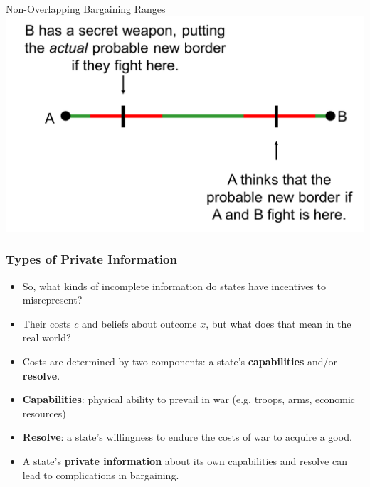 \documentclass{beamer}
\begin{document}
\begin{frame}{Non-Overlapping Bargaining Ranges}
	\centering
	\includegraphics[width=\textwidth,height=0.8\textheight,keepaspectratio]{Bluff3.png}
\end{frame}

\begin{frame} 
	\frametitle{\LARGE{Types of Private Information}}
	\begin{itemize}
		\item So, what kinds of incomplete information do states have incentives to misrepresent? \pause
		\item Their costs $c$ and beliefs about outcome $x$, but what does that mean in the real world? \pause
		\item Costs are determined by two components: a state's \textbf{capabilities} and/or \textbf{resolve}. \pause
		\item \textbf{Capabilities}: physical ability to prevail in war (e.g. troops, arms, economic resources) \pause
		\item \textbf{Resolve}: a state's willingness to endure the costs of war to acquire a good. \pause 
		\item A state's \textbf{private information} about its own capabilities and resolve can lead to complications in bargaining.
	\end{itemize}
\end{frame}
\end{document}
